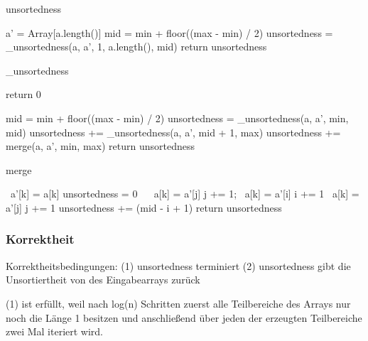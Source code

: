 \documentclass[12pt]{scrartcl}%
\theoremstyle{nonumberplain}
\begin{document}
\begin{algorithm}[H]
	\caption{unsortedness}
	
	\BlankLine
	a' = Array[a.length()]\;
	mid = min + floor((max - min) / 2)\;
	unsortedness = \_unsortedness(a, a', 1, a.length(), mid)\;	
	\BlankLine
	return unsortedness\;	
\end{algorithm}

\begin{algorithm}[H]
	\caption{\_unsortedness}
	
	\BlankLine
	 { return 0\; }
	
	mid = min + floor((max - min) / 2)\;
	unsortedness = \_unsortedness(a, a', min, mid)\;
	unsortedness += \_unsortedness(a, a', mid + 1, max)\;
	unsortedness += merge(a, a', min, max)\;
	\BlankLine
	return unsortedness\;
\end{algorithm}

\begin{algorithm}[H]
	\caption{merge}
	
	\BlankLine
	 {\
		a'[k] = a[k]\;
	}
	unsortedness = 0\;
	 {\
		 {\
			a[k] = a'[j]\;
			j += 1;
		}
		 {\
			a[k] = a'[i]\;
			i += 1\;
		}
		 {\
			a[k] = a'[j]\;
			j += 1\;
			unsortedness += (mid - i + 1)\;
		}
		\Else {\
			a[k] = a'[i]\;
			i += 1\;
		}
	}
	\BlankLine
	return unsortedness\;
\end{algorithm}

\subsubsection*{Korrektheit}
Korrektheitsbedingungen:
\newline
(1) unsortedness terminiert
\newline
(2) unsortedness gibt die Unsortiertheit von des Eingabearrays zurück

(1) ist erfüllt, weil nach log(n) Schritten zuerst alle Teilbereiche des Arrays nur noch die Länge 1 besitzen und anschließend über jeden der erzeugten Teilbereiche zwei Mal iteriert wird.
\end{document}
